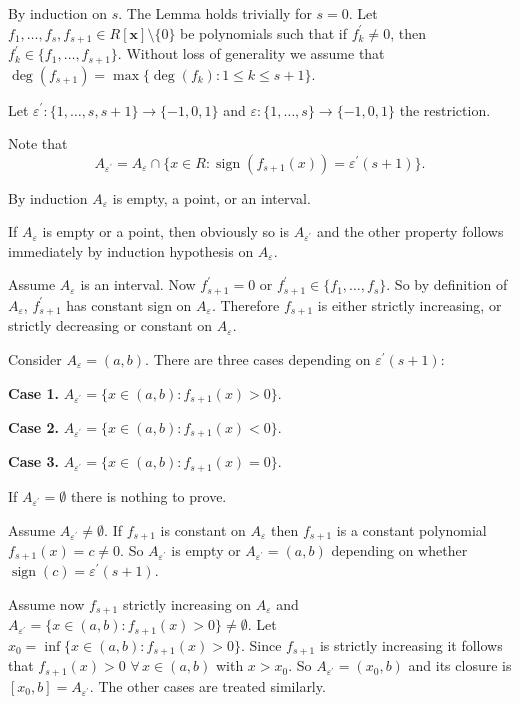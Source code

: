 \documentclass[12pt]{article}
\theoremstyle{mythm}
\let\oldendproof\endproof
\renewenvironment{proof}[1][\proofname]{%
  \oldproof[\normalfont \bfseries \sffamily #1]%
}{\oldendproof}
\renewcommand*{\proofname}{Proof}
\renewcommand*{\proofname}{Proof}
\renewcommand*{\proofname}{Proof}
\renewcommand*{\proofname}{Proof}
\renewcommand*{\proofname}{Proof}
\renewcommand*{\proofname}{Proof}
\renewcommand*{\proofname}{Proof}
\begin{document}
\begin{proof}
   By induction on \(s\). The Lemma holds trivially for \(s=0\). Let \(f_{1},\ldots,f_{s},f_{s+1}\in R[\mathbf{x}]\setminus\{0\}\) be polynomials such that if \(f^{\prime}_{k}\neq 0\), then \(f^{\prime}_{k}\in\{f_{1},\ldots,f_{s+1}\}\). Without loss of generality we assume that \(\deg(f_{s+1})=\max\{\deg(f_{k}):1\leqslant k\leqslant s+1\}\).

Let \(\varepsilon^{\prime}\colon\{1,\ldots,s,s+1\}\to\{-1,0,1\}\) and \(\varepsilon\colon\{1,\ldots,s\}\to\{-1,0,1\}\) the restriction.

Note that
\[
A_{\varepsilon^{\prime}}=A_{\varepsilon}\cap\{x\in R:\operatorname{sign}(f_{s+1}(x))=\varepsilon^{\prime}(s+1)\}.
\]

By induction \(A_{\varepsilon}\) is empty, a point, or an interval.

If \(A_{\varepsilon}\) is empty or a point, then obviously so is \(A_{\varepsilon^{\prime}}\) and the other property follows immediately by induction hypothesis on \(A_{\varepsilon}\).

Assume \(A_{\varepsilon}\) is an interval. Now \(f^{\prime}_{s+1}=0\) or \(f^{\prime}_{s+1}\in\{f_{1},\ldots,f_{s}\}\). So by definition of \(A_{\varepsilon}\), \(f^{\prime}_{s+1}\) has constant sign on \(A_{\varepsilon}\). Therefore \(f_{s+1}\) is either strictly increasing, or strictly decreasing or constant on \(A_{\varepsilon}\).

Consider \(A_{\varepsilon}=(a,b)\). There are three cases depending on \(\varepsilon^{\prime}(s+1)\):

\textbf{Case 1.} \(A_{\varepsilon^{\prime}}=\{x\in(a,b):f_{s+1}(x)>0\}\).

\textbf{Case 2.} \(A_{\varepsilon^{\prime}}=\{x\in(a,b):f_{s+1}(x)<0\}\).

\textbf{Case 3.} \(A_{\varepsilon^{\prime}}=\{x\in(a,b):f_{s+1}(x)=0\}\).

If \(A_{\varepsilon^{\prime}}=\emptyset\) there is nothing to prove.

Assume \(A_{\varepsilon^{\prime}}\neq\emptyset\). If \(f_{s+1}\) is constant on \(A_{\varepsilon}\) then \(f_{s+1}\) is a constant polynomial \(f_{s+1}(x)=c\neq 0\). So \(A_{\varepsilon^{\prime}}\) is empty or \(A_{\varepsilon^{\prime}}=(a,b)\) depending on whether \(\operatorname{sign}(c)=\varepsilon^{\prime}(s+1)\).

Assume now \(f_{s+1}\) strictly increasing on \(A_{\varepsilon}\) and \(A_{\varepsilon^{\prime}}=\{x\in(a,b):f_{s+1}(x)>0\}\neq\emptyset\). Let \(x_{0}=\inf\{x\in(a,b):f_{s+1}(x)>0\}\). Since \(f_{s+1}\) is strictly increasing it follows that \(f_{s+1}(x)>0\) \(\forall\,x\in(a,b)\) with \(x>x_{0}\). So \(A_{\varepsilon^{\prime}}=(x_{0},b)\) and its closure is \([x_{0},b]=A_{\varepsilon^{\prime}}\). The other cases are treated similarly.

\end{proof}
\end{document}
